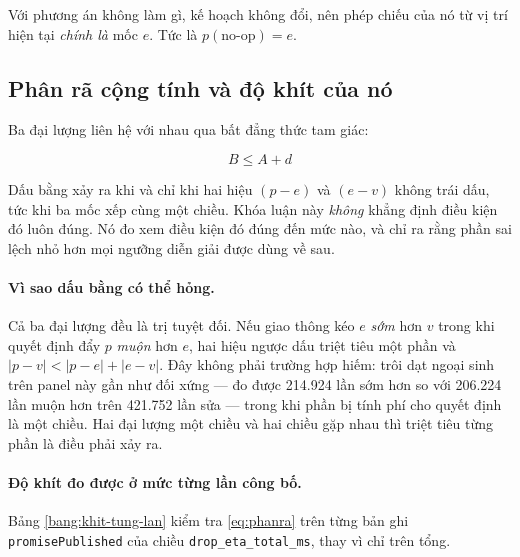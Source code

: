 Với phương án không làm gì, kế hoạch không đổi, nên phép chiếu của nó từ vị trí hiện tại
\emph{chính là} mốc $e$. Tức là $p(\text{no-op}) = e$.

\subsection{Phân rã cộng tính và độ khít của nó}
\label{muc:phanra}

Ba đại lượng liên hệ với nhau qua bất đẳng thức tam giác:

\begin{equation}
\boxed{\,B \le A + d\,}
\label{eq:phanra}
\end{equation}

Dấu bằng xảy ra khi và chỉ khi hai hiệu $(p-e)$ và $(e-v)$ không trái dấu, tức khi ba mốc xếp
cùng một chiều. Khóa luận này \emph{không} khẳng định điều kiện đó luôn đúng. Nó đo xem điều kiện
đó đúng đến mức nào, và chỉ ra rằng phần sai lệch nhỏ hơn mọi ngưỡng diễn giải được dùng về sau.

\paragraph{Vì sao dấu bằng có thể hỏng.} Cả ba đại lượng đều là trị tuyệt đối. Nếu giao thông
kéo $e$ \emph{sớm} hơn $v$ trong khi quyết định đẩy $p$ \emph{muộn} hơn $e$, hai hiệu ngược dấu
triệt tiêu một phần và $|p-v| < |p-e| + |e-v|$. Đây không phải trường hợp hiếm: trôi dạt ngoại
sinh trên panel này gần như đối xứng --- đo được 214.924 lần sớm hơn so với 206.224 lần muộn
hơn trên 421.752 lần sửa --- trong khi phần bị tính phí cho quyết định là một chiều. Hai đại
lượng một chiều và hai chiều gặp nhau thì triệt tiêu từng phần là điều phải xảy ra.

\paragraph{Độ khít đo được ở mức từng lần công bố.} Bảng \ref{bang:khit-tung-lan} kiểm tra
\eqref{eq:phanra} trên từng bản ghi \texttt{promisePublished} của chiều
\texttt{drop\_eta\_total\_ms}, thay vì chỉ trên tổng.

